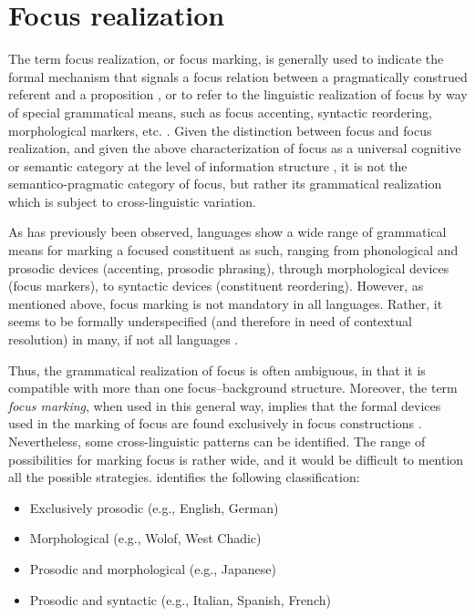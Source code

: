 \section{Focus realization} \label{sub:2.2}
 The term focus realization, or focus marking, is generally used to indicate the formal mechanism that signals a focus relation between a pragmatically construed referent and a proposition \parencite{lambrecht1996information}, or to refer to the linguistic realization of focus by way of special grammatical means, such as focus accenting, syntactic reordering, morphological markers, etc. \parencite{buring2009towards}.
Given the distinction between focus and focus realization, and given the above characterization of focus as a universal cognitive or semantic category at the level of information structure \parencite{zimmermann2011focus}, it is not the semantico-pragmatic category of focus, but rather its grammatical realization which is subject to cross-linguistic variation. 

As has previously been observed, languages show a wide range of grammatical means for marking a focused constituent as such, ranging from phonological and prosodic devices (accenting, prosodic phrasing), through morphological devices (focus markers), to syntactic devices (constituent reordering).
However, as mentioned above, focus marking is not mandatory in all languages. Rather, it seems to be formally underspecified (and therefore in need of contextual resolution) in many, if not all languages \parencite{zimmermann2011grammatical}. 

Thus, the grammatical realization of focus is often ambiguous, in that it is compatible with more than one focus–background structure. Moreover, the term \textit{focus marking}, when used in this general way, implies that the formal devices used in the marking of focus are found exclusively in focus constructions \parencite{fiedler2006subject}.
Nevertheless, some cross-linguistic patterns can be identified. The range of possibilities for marking focus is rather wide, and it would be difficult to mention all the possible strategies. \textcite{lambrecht1996information} identifies the following classification: 

\begin{itemize}
    \item Exclusively prosodic (e.g., English, German)
    \vspace{-0.3cm}
    \item Morphological (e.g., Wolof, West Chadic)
     \vspace{-0.3cm}
    \item Prosodic and morphological (e.g., Japanese)
     \vspace{-0.3cm}
    \item Prosodic and syntactic (e.g., Italian, Spanish, French)
     \vspace{-0.3cm}
\end{itemize}

